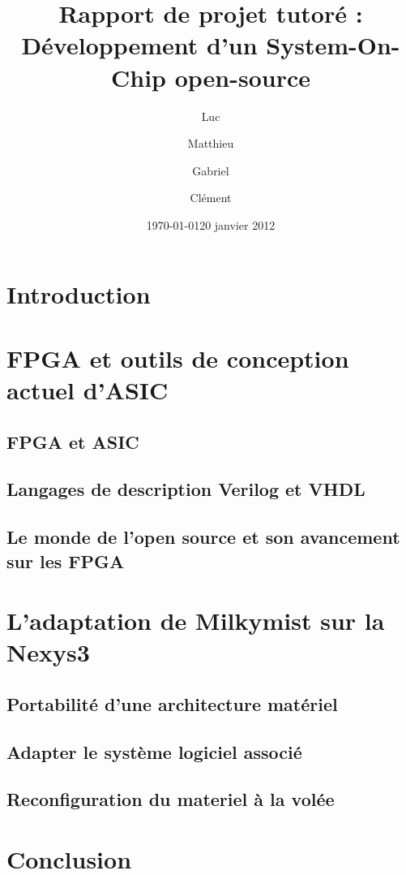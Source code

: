 \documentclass{report}
\date{\today}
\author{}
\title{}
\title{Rapport de projet tutoré : Développement d'un System-On-Chip open-source}
\author{\bsc{DUZAN} Luc \and \bsc{LONGO} Matthieu \and \bsc{FARACHE} Gabriel \and \bsc{MICHAUD} Clément }
\date{20 janvier 2012}
\begin{document}
\maketitle

\tableofcontents

\chapter*{Introduction}

\chapter{FPGA et outils de conception actuel d'ASIC}

\section{FPGA et ASIC}
    

\section{Langages de description Verilog et VHDL}
    

\section{Le monde de l'open source et son avancement sur les FPGA}
    

\chapter{L'adaptation de Milkymist sur la Nexys3}

\section{Portabilité d'une architecture matériel}
    

\section{Adapter le système logiciel associé}
    
    \newpage

\section{Reconfiguration du materiel à la volée}
    
	\newpage

\chapter*{Conclusion}


\end{document}
